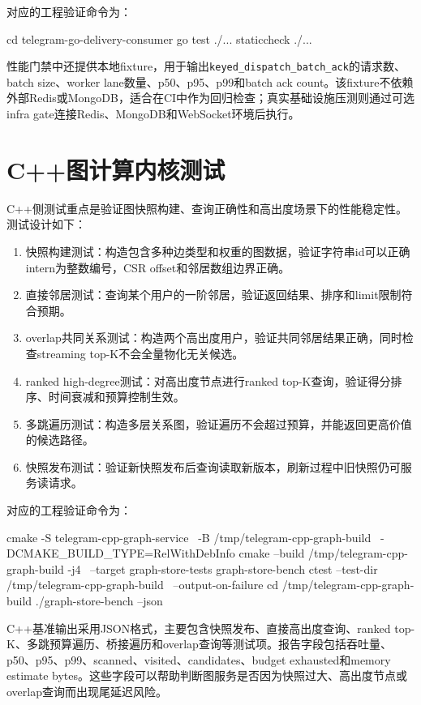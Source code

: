 对应的工程验证命令为：

\begin{terminal}[Go投递服务测试命令]
  cd telegram-go-delivery-consumer
  go test ./...
  staticcheck ./...
\end{terminal}

性能门禁中还提供本地fixture，用于输出\texttt{keyed\_dispatch\_batch\_ack}的请求数、batch size、worker lane数量、p50、p95、p99和batch ack count。该fixture不依赖外部Redis或MongoDB，适合在CI中作为回归检查；真实基础设施压测则通过可选infra gate连接Redis、MongoDB和WebSocket环境后执行。

\section{C++图计算内核测试}

C++侧测试重点是验证图快照构建、查询正确性和高出度场景下的性能稳定性。测试设计如下：

\begin{enumerate}
  \item 快照构建测试：构造包含多种边类型和权重的图数据，验证字符串id可以正确intern为整数编号，CSR offset和邻居数组边界正确。
  \item 直接邻居测试：查询某个用户的一阶邻居，验证返回结果、排序和limit限制符合预期。
  \item overlap共同关系测试：构造两个高出度用户，验证共同邻居结果正确，同时检查streaming top-K不会全量物化无关候选。
  \item ranked high-degree测试：对高出度节点进行ranked top-K查询，验证得分排序、时间衰减和预算控制生效。
  \item 多跳遍历测试：构造多层关系图，验证遍历不会超过预算，并能返回更高价值的候选路径。
  \item 快照发布测试：验证新快照发布后查询读取新版本，刷新过程中旧快照仍可服务读请求。
\end{enumerate}

对应的工程验证命令为：

\begin{terminal}[C++图计算服务测试和基准命令]
  cmake -S telegram-cpp-graph-service \
  -B /tmp/telegram-cpp-graph-build \
  -DCMAKE_BUILD_TYPE=RelWithDebInfo
  cmake --build /tmp/telegram-cpp-graph-build -j4 \
  --target graph-store-tests graph-store-bench
  ctest --test-dir /tmp/telegram-cpp-graph-build \
  --output-on-failure
  cd /tmp/telegram-cpp-graph-build
  ./graph-store-bench --json
\end{terminal}

C++基准输出采用JSON格式，主要包含快照发布、直接高出度查询、ranked top-K、多跳预算遍历、桥接遍历和overlap查询等测试项。报告字段包括吞吐量、p50、p95、p99、scanned、visited、candidates、budget exhausted和memory estimate bytes。这些字段可以帮助判断图服务是否因为快照过大、高出度节点或overlap查询而出现尾延迟风险。

